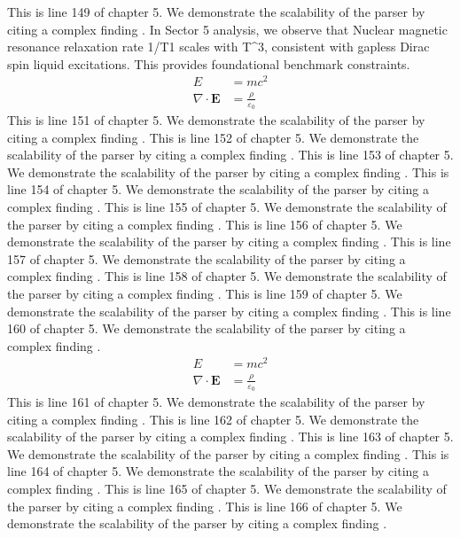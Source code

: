 This is line 149 of chapter 5. We demonstrate the scalability of the parser by citing a complex finding \cite{ref5_149}.
In Sector 5 analysis, we observe that Nuclear magnetic resonance relaxation rate 1/T1 scales with T^3, consistent with gapless Dirac spin liquid excitations. This provides foundational benchmark constraints.
\begin{align*}
  E &= mc^2 \\
  \nabla \cdot \mathbf{E} &= \frac{\rho}{\varepsilon_0}
\end{align*}
This is line 151 of chapter 5. We demonstrate the scalability of the parser by citing a complex finding \cite{ref5_151}.
This is line 152 of chapter 5. We demonstrate the scalability of the parser by citing a complex finding \cite{ref5_152}.
This is line 153 of chapter 5. We demonstrate the scalability of the parser by citing a complex finding \cite{ref5_153}.
This is line 154 of chapter 5. We demonstrate the scalability of the parser by citing a complex finding \cite{ref5_154}.
This is line 155 of chapter 5. We demonstrate the scalability of the parser by citing a complex finding \cite{ref5_155}.
This is line 156 of chapter 5. We demonstrate the scalability of the parser by citing a complex finding \cite{ref5_156}.
This is line 157 of chapter 5. We demonstrate the scalability of the parser by citing a complex finding \cite{ref5_157}.
This is line 158 of chapter 5. We demonstrate the scalability of the parser by citing a complex finding \cite{ref5_158}.
This is line 159 of chapter 5. We demonstrate the scalability of the parser by citing a complex finding \cite{ref5_159}.
This is line 160 of chapter 5. We demonstrate the scalability of the parser by citing a complex finding \cite{ref5_160}.
\begin{align*}
  E &= mc^2 \\
  \nabla \cdot \mathbf{E} &= \frac{\rho}{\varepsilon_0}
\end{align*}
This is line 161 of chapter 5. We demonstrate the scalability of the parser by citing a complex finding \cite{ref5_161}.
This is line 162 of chapter 5. We demonstrate the scalability of the parser by citing a complex finding \cite{ref5_162}.
This is line 163 of chapter 5. We demonstrate the scalability of the parser by citing a complex finding \cite{ref5_163}.
This is line 164 of chapter 5. We demonstrate the scalability of the parser by citing a complex finding \cite{ref5_164}.
This is line 165 of chapter 5. We demonstrate the scalability of the parser by citing a complex finding \cite{ref5_165}.
This is line 166 of chapter 5. We demonstrate the scalability of the parser by citing a complex finding \cite{ref5_166}.
